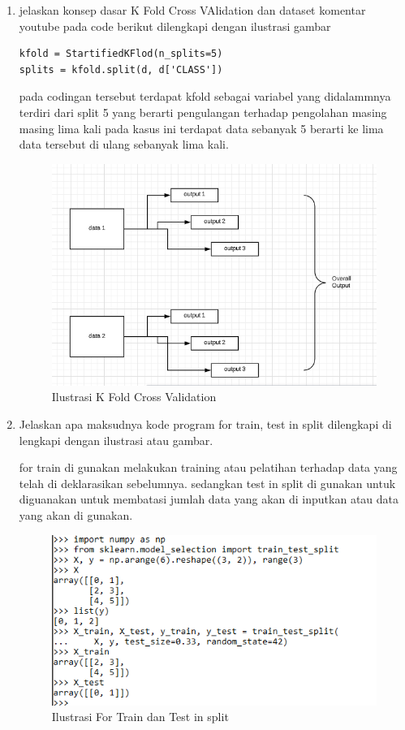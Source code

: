 \begin{enumerate}
\item jelaskan konsep dasar K Fold Cross VAlidation dan dataset komentar youtube pada code berikut dilengkapi dengan ilustrasi gambar 
\begin{verbatim}
kfold = StartifiedKFlod(n_splits=5)
splits = kfold.split(d, d['CLASS'])
\end{verbatim}
pada codingan tersebut terdapat kfold sebagai variabel yang didalammnya terdiri dari split 5 yang berarti pengulangan terhadap pengolahan masing masing lima kali pada kasus ini terdapat data sebanyak 5 berarti ke lima data tersebut di ulang sebanyak lima kali.
\begin{figure}[ht]
\centering
\includegraphics[scale=0.4]{figures/1174002/chapter7/2.PNG}
\caption{Ilustrasi K Fold Cross Validation}
\label{Contoh}
\end{figure}


\item Jelaskan apa maksudnya kode program for train, test in split dilengkapi di lengkapi dengan ilustrasi atau gambar.\par
for train di gunakan melakukan training atau pelatihan terhadap data yang telah di deklarasikan sebelumnya. sedangkan test in split di gunakan untuk diguanakan untuk membatasi jumlah data yang akan di inputkan atau data yang akan di gunakan.
\begin{figure}[ht]
\centering
\includegraphics[scale=0.4]{figures/1174002/chapter7/3.PNG}
\caption{Ilustrasi For Train dan Test in split}
\label{Contoh}
\end{figure}



\end{enumerate}
